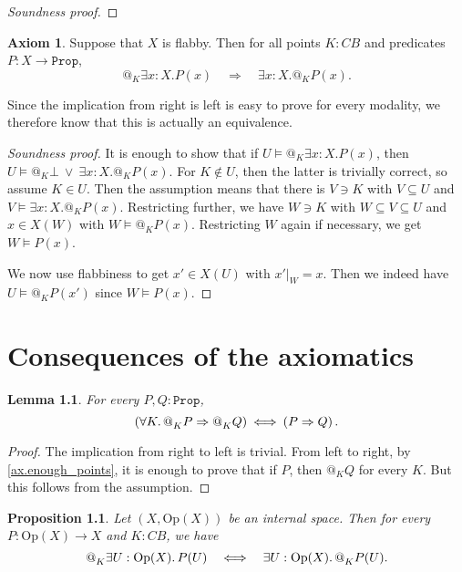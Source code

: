 \documentclass[11pt, oneside, article]{memoir}
\makeatletter
\newcommand{\tob}[1]{\todo[color=blue!40,inline]{\textbf{T:} #1}}
\theoremstyle{plain}
\newtheorem{proposition}[theorem]{Proposition}
\newtheorem{lemma}[theorem]{Lemma}
\theoremstyle{definition}
\newtheorem{axiom}{Axiom}
\theoremstyle{remark}
\newenvironment{soundproof}{\begin{proof}[Soundness proof]}{\end{proof}}
\newcommand{\const}[1]{\mathtt{#1}}
\newcommand{\Set}[1]{\mathrm{#1}}
\newcommand{\Prop}{\const{Prop}}
\newcommand{\Op}{\Set{Op}}
\newcommand{\BaseSpace}{B}
\newcommand{\CB}{C\BaseSpace}
\newcommand{\AtSymbol}{{@}}
\newcommand{\At}[2][]{\AtSymbol^{#1}_{#2}}
\newcommand{\imp}{\Rightarrow}
\makeatother
\begin{document}
\begin{soundproof}
	\tob{tbw}
\end{soundproof}

\begin{axiom}
	\label{ax:flabby_vs_at}
	Suppose that $X$ is flabby. Then for all points $K : \CB$ and predicates $P : X \to \Prop$,
	\[
		\At{K}\exists x:X. P(x) \quad \Longrightarrow \quad \exists x:X.\At{K}P(x).
	\]
\end{axiom}

Since the implication from right is left is easy to prove for every modality, we therefore know that this is actually an equivalence.

\begin{soundproof}
	It is enough to show that if $U \models \At{K} \exists x:X.P(x)$, then $U \models \At{K}\bot \:\lor\: \exists x:X.\At{K}P(x)$. For $K\not\in U$, then the latter is trivially correct, so assume $K \in U$. Then the assumption means that there is $V\ni K$ with $V\subseteq U$ and $V\models \exists x:X.\At{K} P(x)$. Restricting further, we have $W\ni K$ with $W\subseteq V\subseteq U$ and $x\in X(W)$ with $W \models \At{K} P(x)$. Restricting $W$ again if necessary, we get $W \models P(x)$.

	We now use flabbiness to get $x'\in X(U)$ with $x'|_W = x$. Then we indeed have $U\models \At{K} P(x')$ since $W\models P(x)$.
\end{soundproof}


\chapter{Consequences of the axiomatics}

\begin{lemma}
For every $P,Q : \Prop$,
\[
	\left(\forall K\ldotp \At{K} P \imp \At{K} Q\right) \: \Longleftrightarrow \: \left(P \imp Q\right).
\]
\end{lemma}

\begin{proof}
	The implication from right to left is trivial. From left to right, by \cref{ax.enough_points}, it is enough to prove that if $P$, then $\At{K} Q$ for every $K$. But this follows from the assumption.
\end{proof}

\begin{proposition}
	Let $(X,\Op(X))$ be an internal space. Then for every $P : \Op(X)\to X$ and $K : \CB$, we have
	\[
		\At{K} \exists U : \Op(X)\ldotp P(U) \quad \Longleftrightarrow \quad \exists U : \Op(X)\ldotp \At{K} P(U).
	\]
\end{proposition}
\end{document}
